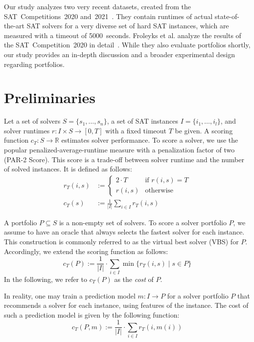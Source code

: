 \documentclass[a4paper,USenglish,pdfa]{lipics-v2021} %
\begin{document}
Our study analyzes two very recent datasets, created from the SAT~Competitions~2020 and~2021~\cite{balyo2020proceedings,balyo2021proceedings}. 
They contain runtimes of actual state-of-the-art SAT solvers for a very diverse set of hard SAT instances, which are measured with a timeout of 5000~seconds.
Froleyks et al. analyze the results of the SAT~Competition~2020 in detail~\cite{SC2020:AIJ}.
While they also evaluate portfolios shortly, our study provides an in-depth discussion and a broader experimental design regarding portfolios.

\section{Preliminaries}
\label{sec:preliminaries}

Let a set of solvers $S = \{s_1, \dots, s_n\}$, a set of SAT instances $I = \{i_1, \dots, i_l\}$, and solver runtimes $r: I \times S \rightarrow [0, T]$ with a fixed timeout $T$ be given.
A scoring function $c_T: S \rightarrow \mathbb{R}$ estimates solver performance. 
To score a solver, we use the popular penalized-average-runtime measure with a penalization factor of two (PAR-2 Score). 
This score is a trade-off between solver runtime and the number of solved instances.
It is defined as follows:%
\begin{align}
r_T(i,s) &:= \begin{cases}
	2 \cdot T & \text{if }r(i,s) = T\\
	r(i,s) & \text{otherwise}
\end{cases} \tag*{Penalized Runtimes}\\[.5em]
c_T(s) &:= \frac{1}{|I|} \sum_{i \in I}{r_T(i,s)} \tag*{PAR-2 Score}
\end{align}

A portfolio $P \subseteq S$ is a non-empty set of solvers.
To score a solver portfolio $P$, we assume to have an oracle that always selects the fastest solver for each instance. 
This construction is commonly referred to as the virtual best solver (VBS) for $P$. 
Accordingly, we extend the scoring function as follows:%
\[
	c_{T}(P) := \frac{1}{|I|} \cdot \sum\limits_{i \in I}{\min\{r_T(i,s) \mid s \in P\}}
\]
In the following, we refer to $c_{T}(P)$ as the \emph{cost} of $P$. 

In reality, one may train a prediction model $m : I \rightarrow P$ for a solver portfolio $P$ that recommends a solver for each instance, using features of the instance. 
The cost of such a prediction model is given by the following function:%
\[
	c_{T}(P,m) := \frac{1}{|I|} \cdot \sum\limits_{i \in I}{r_T(i,m(i))}
\]
\end{document}
